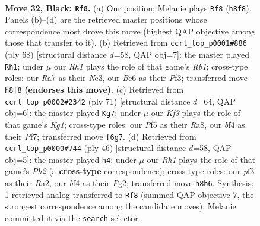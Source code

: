 \documentclass[11pt]{article}
\begin{document}
\clearpage

\begin{figure}[p]\centering
\begin{subfigure}{0.46\textwidth}\centering
\resizebox{\linewidth}{!}{%
\newchessgame
\chessboard[
  setfen={7r/r7/pnB1bkp1/p4p1p/5B2/P4PPN/1P5P/RK1R4 b - - 1 32},
  showmover=false,
  pgfstyle=straightmove, color=movearrow, markmove={h8-f8}
]}
\caption{}
\end{subfigure}\hfill
\begin{subfigure}{0.46\textwidth}\centering
\resizebox{\linewidth}{!}{%
\newchessgame
\chessboard[
  setfen={8/r2k1pp1/p2pb2n/1p2p3/4P3/P1PBNP2/1KP3P1/1R6 w - - 9 35},
  showmover=false,
  pgfstyle=straightmove, color=movearrow, markmove={b1-h1}
]}
\caption{}
\end{subfigure}
\\[4pt]
\begin{subfigure}{0.46\textwidth}\centering
\resizebox{\linewidth}{!}{%
\newchessgame
\chessboard[
  setfen={r5k1/2nb1p2/2p5/2Pp3p/6p1/pNRBP1P1/P4P1P/5K2 b - - 1 36},
  showmover=false,
  pgfstyle=straightmove, color=movearrow, markmove={g8-g7}
]}
\caption{}
\end{subfigure}\hfill
\begin{subfigure}{0.46\textwidth}\centering
\resizebox{\linewidth}{!}{%
\newchessgame
\chessboard[
  setfen={r1r3k1/1p3ppp/p3nb2/P2p4/1P6/3PBN2/R4PPP/1R3K2 w - - 3 24},
  showmover=false,
  pgfstyle=straightmove, color=movearrow, markmove={h2-h4}
]}
\caption{}
\end{subfigure}
\caption{\textbf{Move 32, Black: \texttt{Rf8}.} (a) Our position; Melanie plays \texttt{Rf8} (\texttt{h8f8}). Panels (b)--(d) are the retrieved master positions whose correspondence most drove this move (highest QAP objective among those that transfer to it). (b) Retrieved from \texttt{ccrl\_top\_p0001\#886} (ply 68) [structural distance $d$=58, QAP obj=7]: the master played \texttt{Rh1}; under $\mu$ our \emph{Rh1} plays the role of that game's \emph{Rb1}; cross-type roles: our \emph{R}a7 as their \emph{N}e3, our \emph{B}e6 as their \emph{P}f3; transferred move \texttt{h8f8} \textbf{(endorses this move)}. (c) Retrieved from \texttt{ccrl\_top\_p0002\#2342} (ply 71) [structural distance $d$=64, QAP obj=6]: the master played \texttt{Kg7}; under $\mu$ our \emph{Kf3} plays the role of that game's \emph{Kg1}; cross-type roles: our \emph{P}f5 as their \emph{R}a8, our \emph{b}f4 as their \emph{P}f7; transferred move \texttt{f6g7}. (d) Retrieved from \texttt{ccrl\_top\_p0000\#744} (ply 46) [structural distance $d$=58, QAP obj=5]: the master played \texttt{h4}; under $\mu$ our \emph{Rh1} plays the role of that game's \emph{Ph2} (a \textbf{cross-type} correspondence); cross-type roles: our \emph{p}f3 as their \emph{R}a2, our \emph{b}f4 as their \emph{P}g2; transferred move \texttt{h8h6}. Synthesis: 1 retrieved analog transferred to \texttt{Rf8} (summed QAP objective 7, the strongest correspondence among the candidate moves); Melanie committed it via the \texttt{search} selector.}
\label{fig:thought-m63}
\end{figure}
\end{document}
